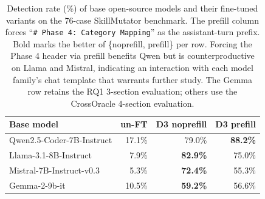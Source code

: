 
\begin{table}[t]
\centering
\caption{Detection rate (\%) of base open-source models and their fine-tuned variants on the 76-case SkillMutator benchmark. The prefill column forces ``\texttt{\# Phase 4: Category Mapping}'' as the assistant-turn prefix. Bold marks the better of \{noprefill, prefill\} per row. Forcing the Phase 4 header via prefill benefits Qwen but is counterproductive on Llama and Mistral, indicating an interaction with each model family's chat template that warrants further study. The Gemma row retains the RQ1 3-section evaluation; others use the CrossOracle 4-section evaluation.}
\label{tab:finetune_rq1}
\footnotesize
\begin{tabular}{lrrr}
\toprule
Base model & un-FT & D3 noprefill & D3 prefill \\
\midrule
Qwen2.5-Coder-7B-Instruct & 17.1\% & 79.0\% & \textbf{88.2\%} \\
Llama-3.1-8B-Instruct     &  7.9\% & \textbf{82.9\%} & 75.0\% \\
Mistral-7B-Instruct-v0.3  &  5.3\% & \textbf{72.4\%} & 55.3\% \\
Gemma-2-9b-it             & 10.5\% & \textbf{59.2\%} & 56.6\% \\
\bottomrule
\end{tabular}
\end{table}